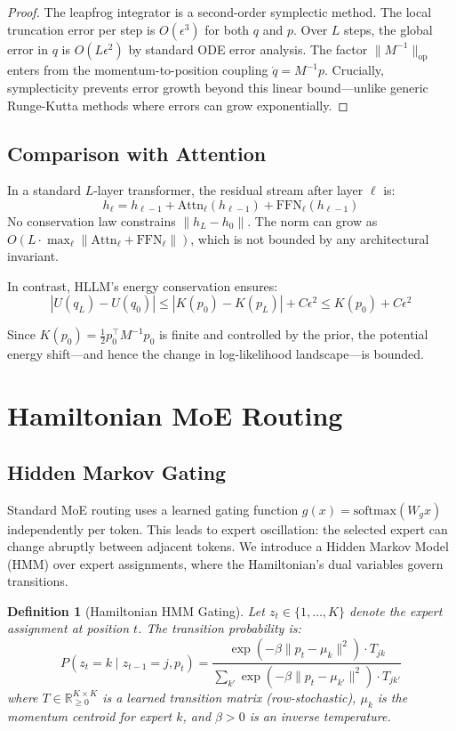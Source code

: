 \documentclass[11pt,letterpaper]{article}
\newtheorem{definition}{Definition}[section]
\newcommand{\R}{\mathbb{R}}
\begin{document}
\begin{proof}
The leapfrog integrator is a second-order symplectic method. The local truncation error per step is $O(\epsilon^3)$ for both $q$ and $p$. Over $L$ steps, the global error in $q$ is $O(L\epsilon^2)$ by standard ODE error analysis. The factor $\|M^{-1}\|_{\text{op}}$ enters from the momentum-to-position coupling $\dot{q} = M^{-1}p$. Crucially, symplecticity prevents error growth beyond this linear bound---unlike generic Runge-Kutta methods where errors can grow exponentially.
\end{proof}

\subsection{Comparison with Attention}

In a standard $L$-layer transformer, the residual stream after layer $\ell$ is:
\[
h_\ell = h_{\ell-1} + \text{Attn}_\ell(h_{\ell-1}) + \text{FFN}_\ell(h_{\ell-1})
\]
No conservation law constrains $\|h_L - h_0\|$. The norm can grow as $O(L \cdot \max_\ell \|\text{Attn}_\ell + \text{FFN}_\ell\|)$, which is not bounded by any architectural invariant.

In contrast, HLLM's energy conservation ensures:
\[
|U(q_L) - U(q_0)| \leq |K(p_0) - K(p_L)| + C\epsilon^2 \leq K(p_0) + C\epsilon^2
\]

Since $K(p_0) = \frac{1}{2}p_0^\top M^{-1} p_0$ is finite and controlled by the prior, the potential energy shift---and hence the change in log-likelihood landscape---is bounded.

\section{Hamiltonian MoE Routing}
\label{sec:moe}

\subsection{Hidden Markov Gating}

Standard MoE routing uses a learned gating function $g(x) = \text{softmax}(W_g x)$ independently per token. This leads to expert oscillation: the selected expert can change abruptly between adjacent tokens. We introduce a Hidden Markov Model (HMM) over expert assignments, where the Hamiltonian's dual variables govern transitions.

\begin{definition}[Hamiltonian HMM Gating]
Let $z_t \in \{1, \ldots, K\}$ denote the expert assignment at position $t$. The transition probability is:
\[
P(z_t = k \mid z_{t-1} = j, p_t) = \frac{\exp(-\beta \|p_t - \mu_k\|^2) \cdot T_{jk}}{\sum_{k'} \exp(-\beta \|p_t - \mu_{k'}\|^2) \cdot T_{jk'}}
\]
where $T \in \R^{K \times K}_{\geq 0}$ is a learned transition matrix (row-stochastic), $\mu_k$ is the momentum centroid for expert $k$, and $\beta > 0$ is an inverse temperature.
\end{definition}
\end{document}
